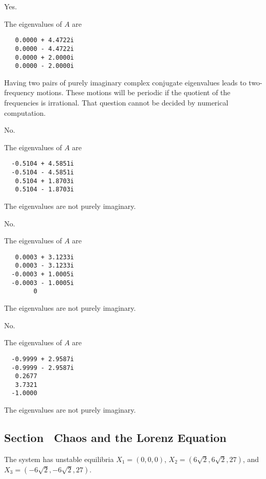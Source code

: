 \documentclass{ximera}
\begin{document}
\begin{figure}[htb]
                       \centerline{%
			\hspace{1.0in}
                       }
\end{figure}

  \ans Yes.

\soln The eigenvalues of $A$ are 
\begin{verbatim}
   0.0000 + 4.4722i
   0.0000 - 4.4722i
   0.0000 + 2.0000i
   0.0000 - 2.0000i
\end{verbatim}
Having two pairs of purely imaginary complex conjugate eigenvalues leads to
two-frequency motions.  These motions will be periodic if the quotient of the 
frequencies is irrational.  That question cannot be decided by numerical
computation.


 \ans No.

\soln The eigenvalues of $A$ are 
\begin{verbatim}
  -0.5104 + 4.5851i
  -0.5104 - 4.5851i
   0.5104 + 1.8703i
   0.5104 - 1.8703i
\end{verbatim}
The eigenvalues are not purely imaginary.

 \ans No.

\soln The eigenvalues of $A$ are 
\begin{verbatim}
   0.0003 + 3.1233i
   0.0003 - 3.1233i
  -0.0003 + 1.0005i
  -0.0003 - 1.0005i
        0          
\end{verbatim}
The eigenvalues are not purely imaginary.

 \ans No.

\soln The eigenvalues of $A$ are 
\begin{verbatim}
  -0.9999 + 2.9587i
  -0.9999 - 2.9587i
   0.2677          
   3.7321          
  -1.0000          
\end{verbatim}
The eigenvalues are not purely imaginary.


\subsection*{Section~\protect{\ref{S:chaos}} Chaos and the Lorenz Equation}


 \ans The system has unstable equilibria $X_1 = (0,0,0)$, 
$X_2 = (6\sqrt{2},6\sqrt{2},27)$, and $X_3 = (-6\sqrt{2},-6\sqrt{2},27)$.
\end{document}
